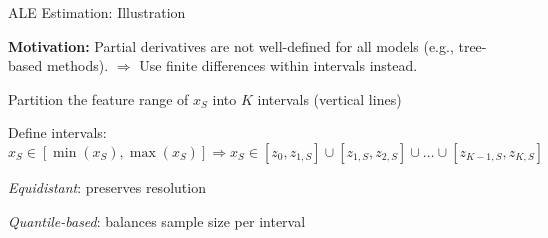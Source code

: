 \documentclass[10pt,compress,t,notes=noshow, xcolor=table]{beamer}
\begin{document}





\begin{framev}[align=top]{ALE Estimation: Illustration}
\begin{itemizeM}
\item \textbf{Motivation:} Partial derivatives are not well-defined for all models (e.g., tree-based methods).
$\Rightarrow$ Use finite differences within intervals instead.
\item<1-> Partition the feature range of $x_S$ into $K$ intervals (vertical lines)
\begin{itemizeS}
\item Define intervals:
$$
x_S \in [\min(x_S), \max(x_S)] \Rightarrow x_S \in [z_{0}, z_{1, S}] \cup [z_{1, S}, z_{2, S}] \cup \dots \cup [z_{K-1, S}, z_{K, S}]
$$
\item \textit{Equidistant}: preserves resolution
\item \textit{Quantile-based}: balances sample size per interval
\end{itemizeS}
\end{itemizeM}
\end{framev}
\end{document}
